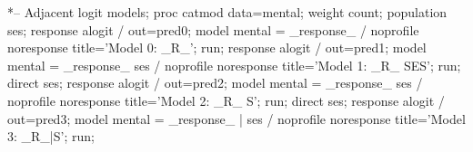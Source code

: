\begin{listing}

*-- Adjacent logit models;
proc catmod data=mental;
   weight count;
   population ses;
   response alogit / out=pred0;
   model mental = _response_ / noprofile noresponse title='Model 0:  _R_';
  run;
   response alogit / out=pred1;
   model mental = _response_  ses / noprofile noresponse title='Model 1: _R_ SES';
  run;
   direct ses;
   response alogit / out=pred2;
   model mental = _response_  ses / noprofile noresponse title='Model 2: _R_ S';
  run;
   direct ses;
   response alogit / out=pred3;
   model mental = _response_ | ses / noprofile noresponse title='Model 3: _R_|S';
  run;
\end{listing}
